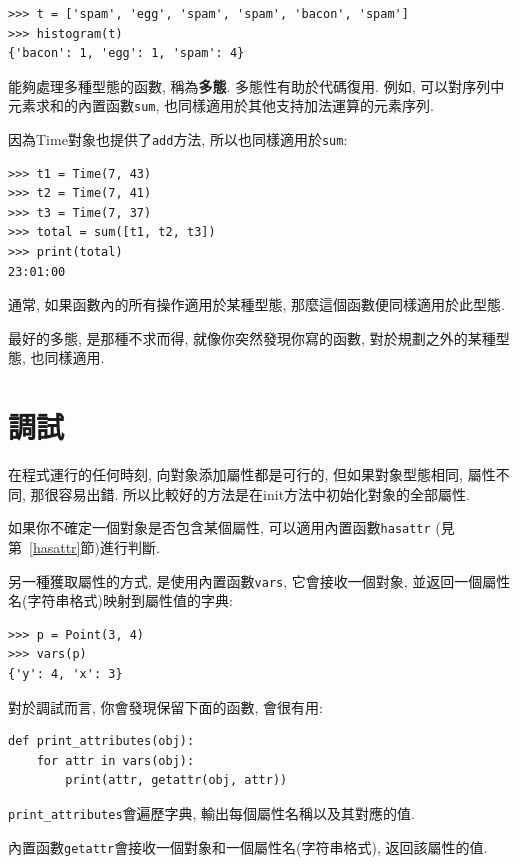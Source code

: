 \documentclass[10pt]{book}
\begin{document}
\begin{verbatim}
>>> t = ['spam', 'egg', 'spam', 'spam', 'bacon', 'spam']
>>> histogram(t)
{'bacon': 1, 'egg': 1, 'spam': 4}
\end{verbatim}
%
能夠處理多種型態的函數, 稱為{\bf 多態}. 
多態性有助於代碼復用. 
例如, 可以對序列中元素求和的內置函數{\tt sum}, 
也同樣適用於其他支持加法運算的元素序列. 

因為Time對象也提供了{\tt add}方法, 所以也同樣適用於{\tt sum}:

\begin{verbatim}
>>> t1 = Time(7, 43)
>>> t2 = Time(7, 41)
>>> t3 = Time(7, 37)
>>> total = sum([t1, t2, t3])
>>> print(total)
23:01:00
\end{verbatim}
%
通常, 如果函數內的所有操作適用於某種型態, 那麼這個函數便同樣適用於此型態. 

最好的多態, 是那種不求而得, 
就像你突然發現你寫的函數, 對於規劃之外的某種型態, 也同樣適用. 


\section{調試}

在程式運行的任何時刻, 向對象添加屬性都是可行的, 
但如果對象型態相同, 屬性不同, 那很容易出錯. 
所以比較好的方法是在init方法中初始化對象的全部屬性. 

如果你不確定一個對象是否包含某個屬性, 可以適用內置函數{\tt hasattr}
 (見第~\ref{hasattr}節)進行判斷. 

另一種獲取屬性的方式, 是使用內置函數{\tt vars},
它會接收一個對象, 並返回一個屬性名(字符串格式)映射到屬性值的字典:

\begin{verbatim}
>>> p = Point(3, 4)
>>> vars(p)
{'y': 4, 'x': 3}
\end{verbatim}
%

對於調試而言, 你會發現保留下面的函數, 會很有用:

\begin{verbatim}
def print_attributes(obj):
    for attr in vars(obj):
        print(attr, getattr(obj, attr))
\end{verbatim}
%
\verb"print_attributes"會遍歷字典, 輸出每個屬性名稱以及其對應的值. 

內置函數{\tt getattr}會接收一個對象和一個屬性名(字符串格式), 返回該屬性的值. 
\end{document}
